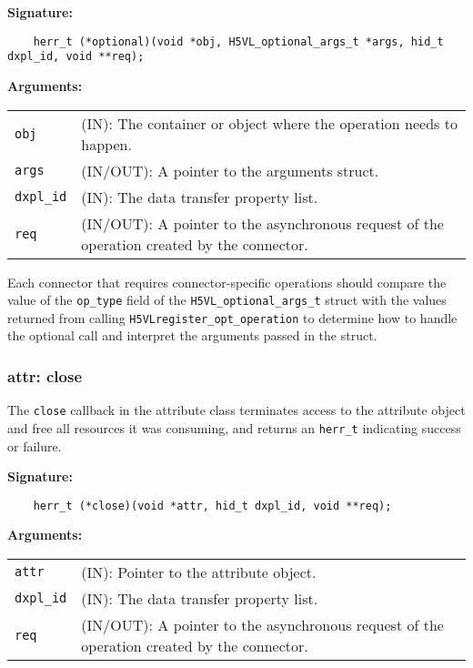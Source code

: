 \begin{mdframed}[style=bgbox]
\textbf{Signature:}
\begin{lstlisting}
    herr_t (*optional)(void *obj, H5VL_optional_args_t *args, hid_t dxpl_id, void **req);
\end{lstlisting}

\textbf{Arguments:}\\
\begin{tabular}{l p{13.5cm}}
  \texttt{obj} & (IN): The container or object where the operation needs to happen.\\
  \texttt{args} & (IN/OUT): A pointer to the arguments struct.\\
  \texttt{dxpl\_id} & (IN): The data transfer property list.\\
  \texttt{req} & (IN/OUT): A pointer to the asynchronous request of the operation created by the connector.\\
\end{tabular}
\end{mdframed}

Each connector that requires connector-specific operations should compare the
value of the {\tt op\_type} field of the {\tt H5VL\_optional\_args\_t} struct
with the values returned from calling {\tt H5VLregister\_opt\_operation} to
determine how to handle the optional call and interpret the arguments passed
in the struct.

\subsubsection{attr: close}
The \texttt{close} callback in the attribute class terminates
access to the attribute object and free all resources it was
consuming, and returns an \texttt{herr\_t} indicating success or failure.\bigskip

\begin{mdframed}[style=bgbox]
\textbf{Signature:}
\begin{lstlisting}
    herr_t (*close)(void *attr, hid_t dxpl_id, void **req);
\end{lstlisting}

\textbf{Arguments:}\\
\begin{tabular}{l p{13.5cm}}
  \texttt{attr} & (IN): Pointer to the attribute object.\\
  \texttt{dxpl\_id} & (IN): The data transfer property list.\\
  \texttt{req} & (IN/OUT): A pointer to the asynchronous request of the
  operation created by the connector.\\
\end{tabular}
\end{mdframed}

